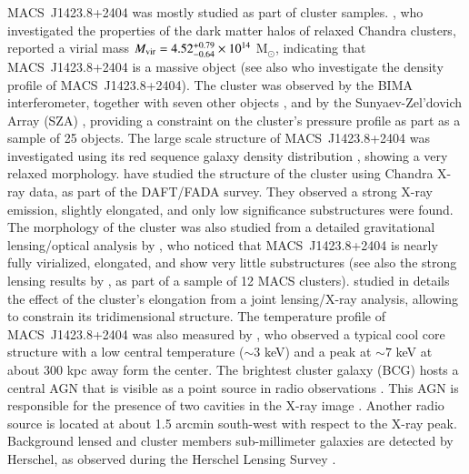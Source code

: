 \documentclass[twocolumn,traditabstract]{aa}
\begin{document}
\mbox{MACS~J1423.8+2404} was mostly studied as part of cluster samples. \cite{schmidt2007}, who investigated the properties of the dark matter halos of relaxed Chandra clusters, reported a virial mass $M_{\rm vir} = 4.52^{+0.79}_{-0.64} \times 10^{14}$ M$_{\odot}$, indicating that \mbox{MACS~J1423.8+2404} is a massive object (see also \cite{delpopolo2012} who investigate the density profile of \mbox{MACS~J1423.8+2404}). The cluster was observed by the BIMA interferometer, together with seven other objects \citep{laroque2003}, and by the Sunyaev-Zel'dovich Array (SZA) \cite{bonamente2012}, providing a constraint on the cluster's pressure profile as part as a sample of 25 objects. The large scale structure of \mbox{MACS~J1423.8+2404} was investigated using its red sequence galaxy density distribution \cite{kartaltepe2008}, showing a very relaxed morphology. \cite{guennou2014} have studied the structure of the cluster using Chandra X-ray data, as part of the DAFT/FADA survey. They observed a strong X-ray emission, slightly elongated, and only low significance substructures were found. The morphology of the cluster was also studied from a detailed gravitational lensing/optical analysis by \cite{limousin2010}, who noticed that \mbox{MACS~J1423.8+2404} is nearly fully virialized, elongated, and show very little substructures (see also the strong lensing results by \cite{zitrin2011}, as part of a sample of 12 MACS clusters). \cite{morandi2010} studied in details the effect of the cluster's elongation from a joint lensing/X-ray analysis, allowing to constrain its tridimensional structure. The temperature profile of \mbox{MACS~J1423.8+2404} was also measured by \cite{morandi2010}, who observed a typical cool core structure with a low central temperature ($\sim 3$ keV) and a peak at $\sim 7$ keV at about 300 kpc away form the center. The brightest cluster galaxy (BCG) hosts a central AGN that is visible as a point source in radio observations \citep{condon1998,laroque2003,coble2007,bonamente2012}. This AGN is responsible for the presence of two cavities in the X-ray image \citep{hlavacek_larrondo2012}. Another radio source is located at about 1.5 arcmin south-west with respect to the X-ray peak. Background lensed and cluster members sub-millimeter galaxies are detected by Herschel, as observed during the Herschel Lensing Survey \citep[HLS,][]{egami2010,rawle2012}.
\end{document}
